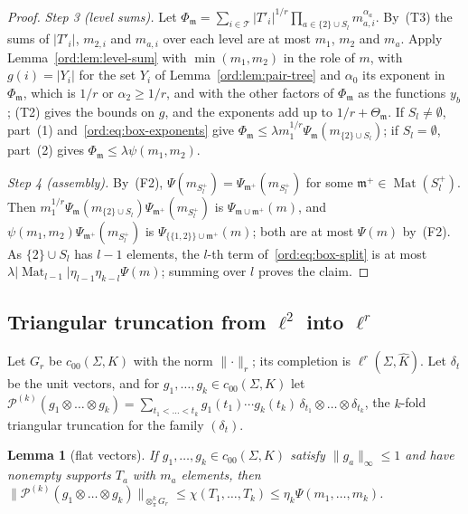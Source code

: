 \documentclass[11pt]{amsart}
\newtheorem{lemma}[theorem]{Lemma}
\theoremstyle{definition}
\theoremstyle{remark}
\numberwithin{equation}{section}
\newcommand{\abs}[1]{\lvert #1\rvert}
\newcommand{\norm}[1]{\lVert #1\rVert}
\newcommand{\Kh}{\widehat K}
\theoremstyle{plain}
\theoremstyle{definition}
\theoremstyle{plain}
\newcommand{\cP}{\mathcal P}
\begin{document}
\begin{proof}
\emph{Step 3 (level sums).} Let $\Phi_{\mathfrak m}=\sum_{i\in\mathcal T}\abs{T'_i}^{1/r}\prod_{a\in\{2\}\cup S_l}m_{a,i}^{\alpha_a}$.
By~(T3) the sums of $\abs{T'_i}$, $m_{2,i}$ and $m_{a,i}$ over each level are at most $m_1$, $m_2$ and $m_a$. Apply
Lemma~\ref{ord:lem:level-sum} with $\min(m_1,m_2)$ in the role of $m$, with $g(i)=\abs{Y_i}$ for the set $Y_i$ of
Lemma~\ref{ord:lem:pair-tree} and $\alpha_0$ its exponent in $\Phi_{\mathfrak m}$, which is $1/r$ or $\alpha_2\ge1/r$,
and with the other factors of $\Phi_{\mathfrak m}$ as the functions $y_b$; (T2) gives the bounds on $g$, and the
exponents add up to $1/r+\Theta_{\mathfrak m}$. If $S_l\ne\emptyset$, part~(1) and~\eqref{ord:eq:box-exponents} give
$\Phi_{\mathfrak m}\le\lambda m_1^{1/r}\Psi_{\mathfrak m}(m_{\{2\}\cup S_l})$; if $S_l=\emptyset$, part~(2) gives
$\Phi_{\mathfrak m}\le\lambda\psi(m_1,m_2)$.

\emph{Step 4 (assembly).} By~(F2), $\Psi(m_{S_l^+})=\Psi_{\mathfrak m^+}(m_{S_l^+})$ for some
$\mathfrak m^+\in\operatorname{Mat}(S_l^+)$. Then $m_1^{1/r}\Psi_{\mathfrak m}(m_{\{2\}\cup S_l})\Psi_{\mathfrak m^+}(m_{S_l^+})$
is $\Psi_{\mathfrak m\cup\mathfrak m^+}(m)$, and $\psi(m_1,m_2)\Psi_{\mathfrak m^+}(m_{S_l^+})$ is
$\Psi_{\{\{1,2\}\}\cup\mathfrak m^+}(m)$; both are at most $\Psi(m)$ by~(F2). As $\{2\}\cup S_l$ has $l-1$ elements, the
$l$-th term of~\eqref{ord:eq:box-split} is at most $\lambda\abs{\operatorname{Mat}_{l-1}}\eta_{l-1}\eta_{k-l}\Psi(m)$;
summing over $l$ proves the claim.
\end{proof}

\subsection{Triangular truncation from \texorpdfstring{$\ell^2$}{l\textasciicircum2} into \texorpdfstring{$\ell^r$}{l\textasciicircum r}}\label{ord:ssec:triangle}

Let $G_r$ be $c_{00}(\Sigma,K)$ with the norm $\norm\cdot_r$; its completion is $\ell^r(\Sigma,\Kh)$. Let $\delta_t$ be the
unit vectors, and for $g_1,\dots,g_k\in c_{00}(\Sigma,K)$ let
$\cP^{(k)}(g_1\otimes\dots\otimes g_k)=\sum_{t_1<\dots<t_k}g_1(t_1)\cdots g_k(t_k)\,\delta_{t_1}\otimes\dots\otimes\delta_{t_k}$,
the $k$\nobreakdash-fold triangular truncation for the family $(\delta_t)$.

\begin{lemma}[flat vectors]\label{ord:lem:flat}
If $g_1,\dots,g_k\in c_{00}(\Sigma,K)$ satisfy $\norm{g_a}_\infty\le1$ and have nonempty supports $T_a$ with $m_a$
elements, then
$\norm{\cP^{(k)}(g_1\otimes\dots\otimes g_k)}_{\otimes^k_\pi G_r}\le\chi(T_1,\dots,T_k)\le\eta_k\Psi(m_1,\dots,m_k)$.
\end{lemma}
\end{document}
